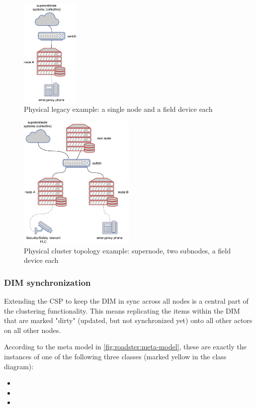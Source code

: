 \begin{figure}[]
	\center
	\includegraphics[width=0.25\textwidth]{img/topo_sl_noha.pdf}
	\caption{Physical legacy example: a single node and a field device each}
	\label{fig:topo:sl:noha}
\end{figure}
\begin{figure}[]
	\center
	\includegraphics[width=0.5\textwidth]{img/topo_ml_noha.pdf}
	\caption{Physical cluster topology example: supernode, two subnodes, a field device each}
	\label{fig:topo:ml:noha}
\end{figure}

\subsubsection{DIM synchronization}
Extending the \gls{CSP} to keep the \gls{DIM} in sync across all nodes is a central
part of the clustering functionality. This means replicating the
items within the DIM that are marked "dirty" (updated, but not synchronized yet) onto all other actors on all other nodes.

According to the meta model in \autoref{fig:roadster:meta-model}, these are exactly
the instances of one of the following three classes (marked yellow in the class diagram):
\begin{itemize}
	\item {}
	\item {}
	\item {}
\end{itemize}

